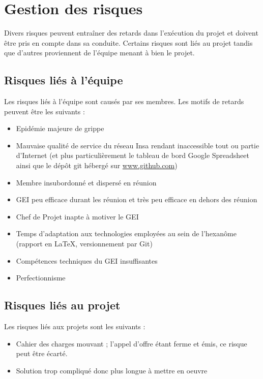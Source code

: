 \section{Gestion des risques}

Divers risques peuvent entraîner des retards dans l'exécution du projet et
doivent être pris en compte dans sa conduite. Certains risques sont liés au
projet tandis que d'autres proviennent de l'équipe menant à bien le projet.

\subsection{Risques liés à l'équipe}

Les risques liés à l'équipe sont causés par ses membres. Les motifs de
retards peuvent être les suivants :

\begin{itemize}

\item Epidémie majeure de grippe
\item Mauvaise qualité de service du réseau Insa rendant inaccessible tout
ou partie d'Internet (et plus particulièrement le tableau de bord Google
Spreadsheet ainsi que le dépôt git hébergé sur \url{www.github.com})
\item Membre insubordonné et dispersé en réunion
\item GEI peu efficace durant les réunion et très peu efficace en dehors
des réunion
\item Chef de Projet inapte à motiver le GEI
\item Temps d'adaptation aux technologies employées au sein de l'hexanôme
(rapport en \LaTeX, versionnement par Git)
\item Compétences techniques du GEI insuffisantes
\item Perfectionnisme

\end{itemize}


\subsection{Risques liés au projet}

Les risques liés aux projets sont les suivants :

\begin{itemize}

\item Cahier des charges mouvant ; l'appel d'offre étant ferme et émis, ce
risque peut être écarté.
\item Solution trop compliqué donc plus longue à mettre en oeuvre

\end{itemize}

\vfill
\pagebreak

